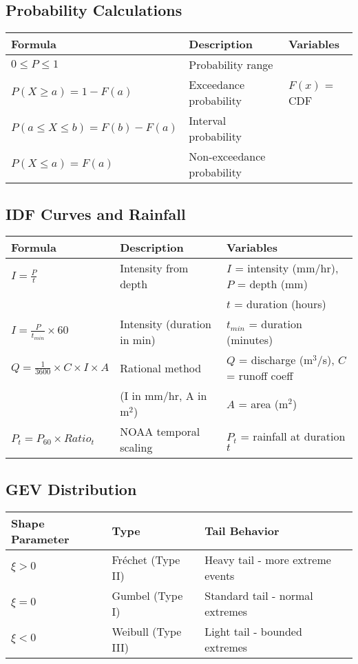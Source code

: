 \documentclass[11pt,a4paper]{article}
\begin{document}
\subsection*{Probability Calculations}
\begin{tabular}{|l|l|l|}
\hline
\textbf{Formula} & \textbf{Description} & \textbf{Variables} \\
\hline
$0 \leq P \leq 1$ & Probability range & \\
$P(X \geq a) = 1 - F(a)$ & Exceedance probability & $F(x)$ = CDF \\
$P(a \leq X \leq b) = F(b) - F(a)$ & Interval probability & \\
$P(X \leq a) = F(a)$ & Non-exceedance probability & \\
\hline
\end{tabular}

\subsection*{IDF Curves and Rainfall}
\begin{tabular}{|l|l|l|}
\hline
\textbf{Formula} & \textbf{Description} & \textbf{Variables} \\
\hline
$I = \frac{P}{t}$ & Intensity from depth & $I$ = intensity (mm/hr), $P$ = depth (mm) \\
& & $t$ = duration (hours) \\
$I = \frac{P}{t_{min}} \times 60$ & Intensity (duration in min) & $t_{min}$ = duration (minutes) \\
$Q = \frac{1}{3600} \times C \times I \times A$ & Rational method & $Q$ = discharge (m$^3$/s), $C$ = runoff coeff \\
& (I in mm/hr, A in m$^2$) & $A$ = area (m$^2$) \\
$P_t = P_{60} \times Ratio_t$ & NOAA temporal scaling & $P_t$ = rainfall at duration $t$ \\
\hline
\end{tabular}

\subsection*{GEV Distribution}
\begin{tabular}{|l|l|l|}
\hline
\textbf{Shape Parameter} & \textbf{Type} & \textbf{Tail Behavior} \\
\hline
$\xi > 0$ & Fréchet (Type II) & Heavy tail - more extreme events \\
$\xi = 0$ & Gumbel (Type I) & Standard tail - normal extremes \\
$\xi < 0$ & Weibull (Type III) & Light tail - bounded extremes \\
\hline
\end{tabular}
\end{document}
